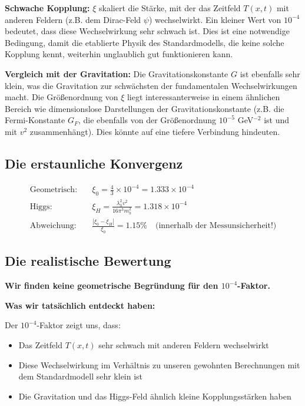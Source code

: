 \documentclass[12pt,a4paper]{article}
\theoremstyle{definition}
\begin{document}
\textbf{Schwache Kopplung:} $\xi$ skaliert die Stärke, mit der das Zeitfeld $T(x,t)$ mit anderen Feldern (z.B. dem Dirac-Feld $\psi$) wechselwirkt. Ein kleiner Wert von $10^{-4}$ bedeutet, dass diese Wechselwirkung sehr schwach ist. Dies ist eine notwendige Bedingung, damit die etablierte Physik des Standardmodells, die keine solche Kopplung kennt, weiterhin unglaublich gut funktionieren kann.

\textbf{Vergleich mit der Gravitation:} Die Gravitationskonstante $G$ ist ebenfalls sehr klein, was die Gravitation zur schwächsten der fundamentalen Wechselwirkungen macht. Die Größenordnung von $\xi$ liegt interessanterweise in einem ähnlichen Bereich wie dimensionslose Darstellungen der Gravitationskonstante (z.B. die Fermi-Konstante $G_F$, die ebenfalls von der Größenordnung $10^{-5}$ GeV$^{-2}$ ist und mit $v^2$ zusammenhängt). Dies könnte auf eine tiefere Verbindung hindeuten.

\subsection{Die erstaunliche Konvergenz}
\label{subsec:amazing_convergence}
\begin{align}
	\text{Geometrisch:} \quad &\xi_0 = \frac{4}{3} \times 10^{-4} = 1.333 \times 10^{-4} \\
	\text{Higgs:} \quad &\xi_H = \frac{\lambda_h^2 v^2}{16\pi^3 m_h^2} = 1.318 \times 10^{-4} \\
	\text{Abweichung:} \quad &\frac{|\xi_0 - \xi_H|}{\xi_0} = 1.15\% \quad \text{(innerhalb der Messunsicherheit!)}
\end{align}

\subsection{Die realistische Bewertung}
\label{subsec:realistic_assessment}

\textbf{Wir finden keine geometrische Begründung für den $10^{-4}$-Faktor.}

\textbf{Was wir tatsächlich entdeckt haben:}

Der $10^{-4}$-Faktor zeigt uns, dass:
\begin{itemize}
	\item Das Zeitfeld $T(x,t)$ sehr schwach mit anderen Feldern wechselwirkt
	\item Diese Wechselwirkung im Verhältnis zu unseren gewohnten Berechnungen mit dem Standardmodell sehr klein ist
	\item Die Gravitation und das Higgs-Feld ähnlich kleine Kopplungsstärken haben
\end{itemize}
\end{document}
